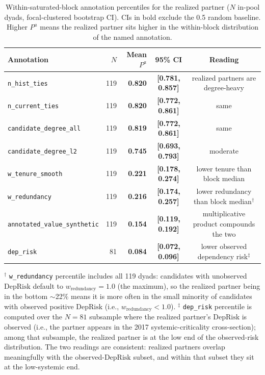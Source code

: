 \documentclass[11pt,letterpaper]{article}
\begin{document}
\begin{table}[H]
\centering
\footnotesize
\caption{Within-saturated-block annotation percentiles for the
realized partner ($N$ in-pool dyads, focal-clustered bootstrap CI).
CIs in bold exclude the 0.5 random baseline.  Higher $P^a$ means
the realized partner sits higher in the within-block distribution
of the named annotation.}
\label{tab:within-block}
\begin{tabular}{lrrcc}
\toprule
Annotation & $N$ & Mean $P^a$ & 95\% CI & Reading \\
\midrule
\texttt{n\_hist\_ties}                  & 119 & \textbf{0.820} & \textbf{[0.781, 0.857]} & realized partners are degree-heavy \\
\texttt{n\_current\_ties}               & 119 & \textbf{0.820} & \textbf{[0.772, 0.861]} & same \\
\texttt{candidate\_degree\_all}         & 119 & \textbf{0.819} & \textbf{[0.772, 0.861]} & same \\
\texttt{candidate\_degree\_l2}          & 119 & \textbf{0.745} & \textbf{[0.693, 0.793]} & moderate \\
\texttt{w\_tenure\_smooth}              & 119 & \textbf{0.221} & \textbf{[0.178, 0.274]} & lower tenure than block median \\
\texttt{w\_redundancy}                  & 119 & \textbf{0.216} & \textbf{[0.174, 0.257]} & lower redundancy than block median$^\dagger$ \\
\texttt{annotated\_value\_synthetic}    & 119 & \textbf{0.154} & \textbf{[0.119, 0.192]} & multiplicative product compounds the two \\
\texttt{dep\_risk}                      &  81 & \textbf{0.084} & \textbf{[0.072, 0.096]} & lower observed dependency risk$^\ddagger$ \\
\bottomrule
\end{tabular}
\end{table}

\vspace{-0.4em}
\noindent\footnotesize $^\dagger$ \texttt{w\_redundancy} percentile
includes all 119 dyads: candidates with unobserved $\text{DepRisk}$
default to $w_{\text{redundancy}} = 1.0$ (the maximum), so the
realized partner being in the bottom $\sim$22\% means it is more
often in the small minority of candidates with observed positive
$\text{DepRisk}$ (i.e., $w_{\text{redundancy}} < 1.0$).
$^\ddagger$ \texttt{dep\_risk} percentile is computed over the
$N=81$ subsample where the realized partner's $\text{DepRisk}$ is
observed (i.e., the partner appears in the 2017
systemic-criticality cross-section); among that subsample, the
realized partner is at the low end of the observed-risk
distribution.  The two readings are consistent: realized partners
overlap meaningfully with the observed-$\text{DepRisk}$ subset, and
within that subset they sit at the low-systemic end.\normalsize
\end{document}
